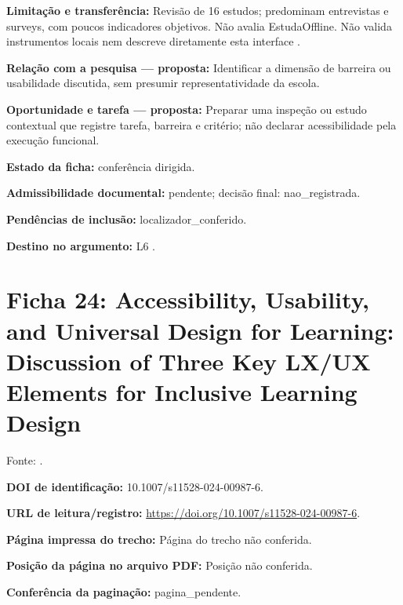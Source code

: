 \noindent\textbf{Limitação e transferência:} Revisão de 16 estudos; predominam entrevistas e surveys, com poucos indicadores objetivos. Não avalia EstudaOffline. Não valida instrumentos locais nem descreve diretamente esta interface \citep{bong2021}.\par\medskip

\noindent\textbf{Relação com a pesquisa — proposta:} Identificar a dimensão de barreira ou usabilidade discutida, sem presumir representatividade da escola.\par\medskip

\noindent\textbf{Oportunidade e tarefa — proposta:} Preparar uma inspeção ou estudo contextual que registre tarefa, barreira e critério; não declarar acessibilidade pela execução funcional.\par\medskip

\noindent\textbf{Estado da ficha:} conferência dirigida.\par\medskip

\noindent\textbf{Admissibilidade documental:} pendente; decisão final: nao\_registrada.\par\medskip

\noindent\textbf{Pendências de inclusão:} localizador\_conferido.\par\medskip

\noindent\textbf{Destino no argumento:} L6 .

\clearpage\section*{Ficha 24: Accessibility, Usability, and Universal Design for Learning: Discussion of Three Key LX/UX Elements for Inclusive Learning Design}

Fonte: \citet{choi2024}.

\noindent\textbf{DOI de identificação:} 10.1007/s11528-024-00987-6.\par\medskip

\noindent\textbf{URL de leitura/registro:} \url{https://doi.org/10.1007/s11528-024-00987-6}.\par\medskip

\noindent\textbf{Página impressa do trecho:} Página do trecho não conferida.\par\medskip

\noindent\textbf{Posição da página no arquivo PDF:} Posição não conferida.\par\medskip

\noindent\textbf{Conferência da paginação:} pagina\_pendente.\par\medskip

